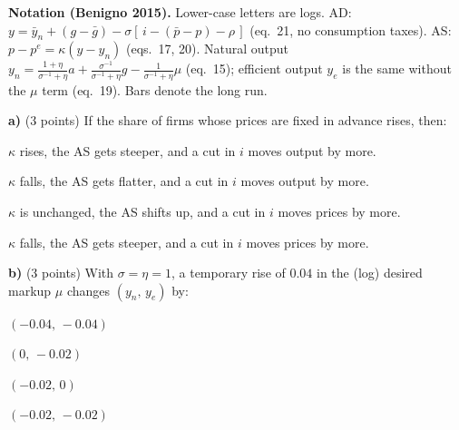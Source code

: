 \documentclass[11pt,a4paper]{article}
\begin{document}
\cabecalho

{\footnotesize\noindent\textbf{Notation (Benigno 2015).} Lower-case letters are logs. AD:
$y=\bar y_n+(g-\bar g)-\sigma[\,i-(\bar p-p)-\rho\,]$ (eq.\ 21, no consumption taxes).
AS: $p-p^e=\kappa(y-y_n)$ (eqs.\ 17, 20). Natural output
$y_n=\frac{1+\eta}{\sigma^{-1}+\eta}a+\frac{\sigma^{-1}}{\sigma^{-1}+\eta}g-\frac{1}{\sigma^{-1}+\eta}\mu$ (eq.\ 15);
efficient output $y_e$ is the same without the $\mu$ term (eq.\ 19). Bars denote the long run.\par}



\textbf{a)} (3 points) If the share of firms whose prices are fixed in advance rises, then:
\begin{alternativas}
\item $\kappa$ rises, the AS gets steeper, and a cut in $i$ moves output by more.
\item $\kappa$ falls, the AS gets flatter, and a cut in $i$ moves output by more.
\item $\kappa$ is unchanged, the AS shifts up, and a cut in $i$ moves prices by more.
\item $\kappa$ falls, the AS gets steeper, and a cut in $i$ moves prices by more.
\end{alternativas}
\begin{sol}
\end{sol}

\medskip
\textbf{b)} (3 points) With $\sigma=\eta=1$, a temporary rise of $0.04$ in the (log) desired markup
$\mu$ changes $(y_n,\,y_e)$ by:
\begin{alternativas}
\item $(-0.04,\,-0.04)$
\item $(0,\,-0.02)$
\item $(-0.02,\,0)$
\item $(-0.02,\,-0.02)$
\end{alternativas}
\begin{sol}
\end{sol}
\end{document}

